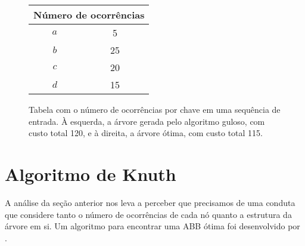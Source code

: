 \begin{figure}[h]
\centering
\begin{minipage}[c]{0.35\textwidth}
  \centering
  \begin{tabular}{|c|c|}
  \hline
  \multicolumn{2}{|c|}{\textbf{Número de ocorrências}} \\
  \hline
  \textbf{$a$} & 5 \\
  $b$ & 25 \\
  $c$ & 20 \\
  $d$ & 15 \\
  \hline
  \end{tabular}
  \end{minipage}
\begin{minipage}[c]{0.3\textwidth}
\centering
{}
\end{minipage}
\begin{minipage}[c]{0.3\textwidth}
\centering
{}
\end{minipage}
\caption{Tabela com o número de ocorrências por chave em uma sequência de entrada. À esquerda, a árvore gerada pelo algoritmo guloso, com custo total 120, e à direita, a árvore ótima, com custo total 115.}
\label{fig:caso-guloso-subotimo}
\end{figure}

\section{Algoritmo de Knuth}

A análise da seção anterior nos leva a perceber que precisamos de uma conduta que considere tanto o número de ocorrências de cada nó quanto a estrutura da árvore em si. Um algoritmo para encontrar uma ABB ótima foi desenvolvido por \cite{knuth}.

